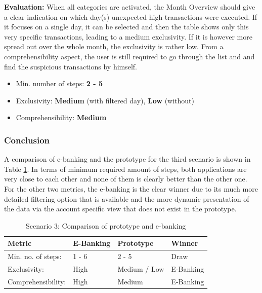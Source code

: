 \textbf{Evaluation:} When all categories are activated, the Month Overview should give a clear indication on which day(s) unexpected high transactions were executed. If it focuses on a single day, it can be selected and then the table shows only this very specific transactions, leading to a medium exclusivity. If it is however more spread out over the whole month, the exclusivity is rather low. From a comprehensibility aspect, the user is still required to go through the list and and find the suspicious transactions by himself.
\begin{itemize}[noitemsep,nolistsep]
	\item Min. number of steps: \textbf{2 - 5}
	\item Exclusivity: \textbf{Medium} (with filtered day), \textbf{Low} (without)
	\item Comprehensibility: \textbf{Medium}
\end{itemize}



\subsubsection{Conclusion}

A comparison of e-banking and the prototype for the third scenario is shown in Table \ref{tbl:scenariothreecomparison}. In terms of minimum required amount of steps, both applications are very close to each other and none of them is clearly better than the other one. For the other two metrics, the e-banking is the clear winner due to its much more detailed filtering option that is available and the more dynamic presentation of the data via the account specific view that does not exist in the prototype.
\begin{table}[h]
	\begin{center}
		\begin{tabular}{ | p{3.2cm} | p{3.8cm} | p{3.5cm} | p{2.5cm} | }
			\hline
			\textbf{Metric} & \textbf{E-Banking} & \textbf{Prototype} & \textbf{Winner} \\
			\hline
			Min. no. of steps: & 1 - 6 & 2 - 5 & Draw \\
			\hline
			Exclusivity: & High & Medium / Low & E-Banking \\
			\hline
			Comprehensibility: & High & Medium & E-Banking \\
			\hline
		\end{tabular}
		\caption{Scenario 3: Comparison of prototype and e-banking}
		\label{tbl:scenariothreecomparison}
	\end{center}
\end{table}


